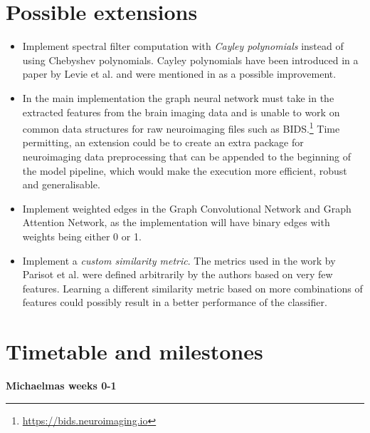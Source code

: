 \documentclass[12pt,a4paper,twoside]{article}
\begin{document}
\section*{Possible extensions}
\begin{itemize}
  \item Implement spectral filter computation with \textit{Cayley polynomials} instead of using Chebyshev polynomials. Cayley polynomials have been introduced in a paper by Levie et al. \cite{levie2017cayleynets} and were mentioned in \cite{parisot2018disease} as a possible improvement.
  \item In the main implementation the graph neural network must take in the extracted features from the brain imaging data and is unable to work on common data structures for raw neuroimaging files such as BIDS.\footnote{\url{https://bids.neuroimaging.io}} Time permitting, an extension could be to create an extra package for neuroimaging data preprocessing that can be appended to the beginning of the model pipeline, which would make the execution more efficient, robust and generalisable.  
  \item Implement weighted edges in the Graph Convolutional Network and Graph Attention Network, as the implementation will have binary edges with weights being either 0 or 1.
  \item Implement a \textit{custom similarity metric}. The metrics used in the work by Parisot et al. \cite{parisot2018disease} were defined arbitrarily by the authors based on very few features. Learning a different similarity metric based on more combinations of features could possibly result in a better performance of the classifier.

\end{itemize}


\section*{Timetable and milestones}
\label{section:timetable}



\textbf{Michaelmas weeks 0-1}
\end{document}
